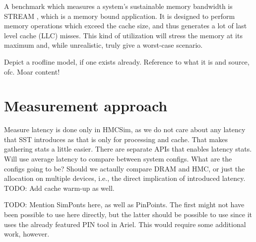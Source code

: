 A benchmark which measures a system's sustainable memory bandwidth is STREAM \cite{mccalpin1995memory}, which is a memory bound application. It is designed to perform memory operations which exceed the cache size, and thus generates a lot of last level cache (LLC) misses. This kind of utilization will stress the memory at its maximum and, while unrealistic, truly give a worst-case scenario.

Depict a roofline model, if one exists already. Reference to what it is and source, ofc. Moar content!


\section{Measurement approach}
Measure latency is done only in HMCSim, as we do not care about any latency that SST introduces as that is only for processing and cache. That makes gathering stats a little easier. There are separate APIs that enables latency stats. Will use average latency to compare between system configs. What are the configs going to be? Should we actaully compare DRAM and HMC, or just the allocation on multiple devices, i.e., the direct implication of introduced latency. TODO: Add cache warm-up as well.

TODO: Mention SimPonts here, as well as PinPoints. The first might not have been possible to use here directly, but the latter should be possible to use since it uses the already featured PIN tool in Ariel. This would require some additional work, however. 
